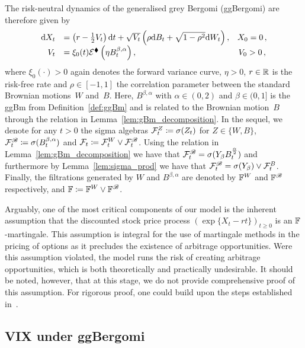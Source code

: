The risk-neutral dynamics of the generalised grey Bergomi (ggBergomi) are therefore given by
\begin{equation}\label{eq:ggBergomi_dynamics}
\begin{array}{rlc}
\mathrm{d} X_t &= \left(r-\frac{1}{2} V_t\right) \mathrm{d} t+\sqrt{V_t} \left(\rho\mathrm{d} B_t + \sqrt{1-\rho^2}\mathrm{d} W_t\right), & X_0=0\,, \\
V_t &=\xi_0(t) \mathcal{E}^\blacklozenge\left(\eta B_t^{\beta, \alpha}\right), & V_0>0\,,
\end{array}
\end{equation}
where $\xi_0(\cdot)>0$ again denotes the forward variance curve, $\eta>0$, $r\in\mathbb{R}$ is the risk-free rate and $\rho\in[-1,1]$ the correlation parameter between the standard Brownian motions~$W$ and~$B$. 
Here, $B^{\beta, \alpha}$ with $\alpha\in(0,2)$ %
and $\beta\in(0,1]$ is the ggBm from Definition~\ref{def:ggBm} and is related to the Brownian motion~$B$ through the relation in Lemma~\ref{lem:gBm_decomposition}. 
In the sequel, we denote for any $t>0$ the sigma algebras $\mathcal{F}^Z_t\coloneqq \sigma(Z_t)$ for $Z\in\{W,B\}$, $\mathcal{F}^{\mathscr{B}}_t\coloneqq \sigma(B^{\beta,\alpha}_t)$ and $\mathcal{F}_t\coloneqq \mathcal{F}^W_t\lor \mathcal{F}^{\mathscr{B}}_t$. Using the relation in Lemma~\ref{lem:gBm_decomposition} we have that $\mathcal{F}^{\mathscr{B}}_t= \sigma(Y_\beta B^{\frac\alpha2}_t)$ and furthermore by Lemma~\ref{lem:sigma_prod} we have that $\mathcal{F}^{\mathscr{B}}_t=\sigma(Y_\beta) \lor \mathcal{F}_t^B$. Finally, the filtrations generated by $W$ and $B^{\beta,\alpha}$ are denoted by $\mathbb{F}^W$ and $\mathbb{F}^{\mathscr{B}}$ respectively, and $\mathbb{F} \coloneqq \mathbb{F}^W \lor\mathbb{F}^{\mathscr{B}}$.

Arguably, one of the most critical components of our model is the inherent assumption that the discounted stock price process $\left(\exp\{X_t - rt\}\right)_{t\geq 0}$ is an $\mathbb{F}$-martingale. This assumption is integral for the use of martingale methods in the pricing of options as it precludes the existence of arbitrage opportunities. Were this assumption violated, the model runs the risk of creating arbitrage opportunities, which is both theoretically and practically undesirable. It should be noted, however, that at this stage, we do not provide comprehensive proof of this assumption. For rigorous proof, one could build upon the steps established in~\cite{Gassiat2019OnModel}.


\subsection{VIX under ggBergomi}

